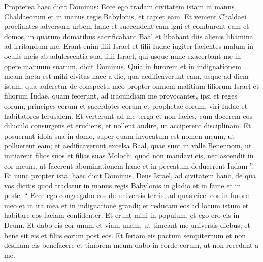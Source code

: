 \begin{biblechapter}
\begin{biblechapter}
\begin{biblechapter}
\begin{biblechapter}
\begin{biblechapter}
\begin{biblechapter}
\begin{biblechapter}
\begin{biblechapter}
\begin{biblechapter}
\begin{biblechapter}
\begin{biblechapter}
\begin{biblechapter}
\begin{biblechapter}
\begin{biblechapter}
\begin{biblechapter}
\begin{biblechapter}
\begin{biblechapter}
\begin{biblechapter}
\begin{biblechapter}
\begin{biblechapter}
\begin{biblechapter}
\begin{biblechapter}
\begin{biblechapter}
\begin{biblechapter}
\begin{biblechapter}
\begin{biblechapter}
\begin{biblechapter}
\begin{biblechapter}
\begin{biblechapter}
\begin{biblechapter}
\begin{biblechapter}
\begin{biblechapter}
\verse Propterea haec dicit Dominus: Ecce ego tradam civitatem istam in manus Chaldaeorum et in manus regis Babylonis, et capiet eam. 
\verse Et venient Chaldaei proeliantes adversum urbem hanc et succendent eam igni et comburent eam et domos, in quarum domatibus sacrificabant Baal et libabant diis alienis libamina ad irritandum me. 
 \verse Erant enim filii Israel et filii Iudae iugiter facientes malum in oculis meis ab adulescentia sua, filii Israel, qui usque nunc exacerbant me in opere manuum suarum, dicit Dominus. 
\verse Quia in furorem et in indignationem meam facta est mihi civitas haec a die, qua aedificaverunt eam, usque ad diem istam, qua auferetur de conspectu meo 
\verse propter omnem malitiam filiorum Israel et filiorum Iudae, quam fecerunt, ad iracundiam me provocantes, ipsi et reges eorum, principes eorum et sacerdotes eorum et prophetae eorum, viri Iudae et habitatores Ierusalem. 
\verse Et verterunt ad me terga et non facies, cum docerem eos diluculo consurgens et erudiens, et nollent audire, ut acciperent disciplinam. 
\verse Et posuerunt idola sua in domo, super quam invocatum est nomen meum, ut polluerent eam; 
\verse et aedificaverunt excelsa Baal, quae sunt in valle Benennom, ut initiarent filios suos et filias suas Moloch; quod non mandavi eis, nec ascendit in cor meum, ut facerent abominationem hanc et in peccatum deducerent Iudam ”.
 \verse Et nunc propter ista, haec dicit Dominus, Deus Israel, ad civitatem hanc, de qua vos dicitis quod tradatur in manus regis Babylonis in gladio et in fame et in peste: 
\verse “ Ecce ego congregabo eos de universis terris, ad quas eieci eos in furore meo et in ira mea et in indignatione grandi; et reducam eos ad locum istum et habitare eos faciam confidenter. 
\verse Et erunt mihi in populum, et ego ero eis in Deum. 
\verse Et dabo eis cor unum et viam unam, ut timeant me universis diebus, et bene sit eis et filiis eorum post eos. 
\verse Et feriam eis pactum sempiternum et non desinam eis benefacere et timorem meum dabo in corde eorum, ut non recedant a me. 

\end{biblechapter}
\end{biblechapter}
\end{biblechapter}
\end{biblechapter}
\end{biblechapter}
\end{biblechapter}
\end{biblechapter}
\end{biblechapter}
\end{biblechapter}
\end{biblechapter}
\end{biblechapter}
\end{biblechapter}
\end{biblechapter}
\end{biblechapter}
\end{biblechapter}
\end{biblechapter}
\end{biblechapter}
\end{biblechapter}
\end{biblechapter}
\end{biblechapter}
\end{biblechapter}
\end{biblechapter}
\end{biblechapter}
\end{biblechapter}
\end{biblechapter}
\end{biblechapter}
\end{biblechapter}
\end{biblechapter}
\end{biblechapter}
\end{biblechapter}
\end{biblechapter}
\end{biblechapter}

